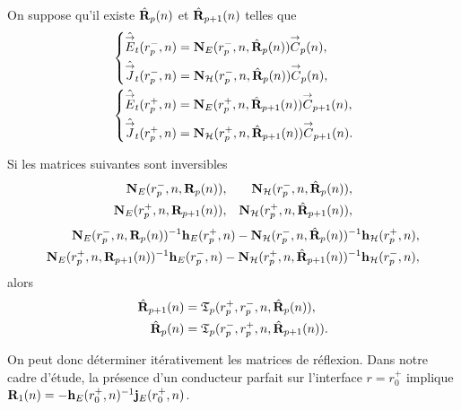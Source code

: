     \begin{prop}%
      \label{prop:sphere:synthese:reflexion}
      On suppose qu'il existe \(\hat{\mathbf{R}}_{p}(n)\) et \(\hat{\mathbf{R}}_{p+1}(n)\) telles que 
      \begin{align*}
      &\left\lbrace\begin{aligned}
        \hat{{\overset{\rightarrow}{E}}}_t(r_{p}^-,n) &= \mathbf{N}_{E}(r_p^-,n,\hat{\mathbf{R}}_{p}(n)){\overset{\rightarrow}{C}}_{p}(n),
        \\
        \hat{{\overset{\rightarrow}{J}}}_t(r_{p}^-,n) &= \mathbf{N}_{\mathcal{H}}(r_p^-,n,\hat{\mathbf{R}}_{p}(n)){\overset{\rightarrow}{C}}_{p}(n),
        \end{aligned}
      \right.
      \\
      &\left\lbrace\begin{aligned}
        \hat{{\overset{\rightarrow}{E}}}_t(r_{p}^+,n) &= \mathbf{N}_{E}(r_p^+,n,\hat{\mathbf{R}}_{p+1}(n)){\overset{\rightarrow}{C}}_{p+1}(n),
        \\
        \hat{{\overset{\rightarrow}{J}}}_t(r_{p}^+,n) &= \mathbf{N}_{\mathcal{H}}(r_p^+,n,\hat{\mathbf{R}}_{p+1}(n)){\overset{\rightarrow}{C}}_{p+1}(n).
        \end{aligned}
      \right.      
      \end{align*}

      Si les matrices suivantes sont inversibles
      \begin{align*}
        \mathbf{N}_{E}(r_p^-,n,\mathbf{R}_{p}(n)), && \mathbf{N}_{\mathcal{H}}(r_p^-,n,\hat{\mathbf{R}}_{p}(n)),
        \\
        \mathbf{N}_{E}(r_p^+,n,\mathbf{R}_{p+1}(n)), && \mathbf{N}_{\mathcal{H}}(r_p^+,n,\hat{\mathbf{R}}_{p+1}(n)),
      \end{align*}
      \begin{align*}
        \mathbf{N}_{E}(r_p^-,n,\mathbf{R}_{p}(n))^{-1}\mathbf{h}_{E}(r_p^+,n) - \mathbf{N}_{\mathcal{H}}(r_p^-,n,\hat{\mathbf{R}}_{p}(n))^{-1}\mathbf{h}_{\mathcal{H}}(r_p^+,n),
        \\
        \mathbf{N}_{E}(r_p^+,n,\mathbf{R}_{p+1}(n))^{-1}\mathbf{h}_{E}(r_p^-,n) - \mathbf{N}_{\mathcal{H}}(r_p^+,n,\hat{\mathbf{R}}_{p+1}(n))^{-1}\mathbf{h}_{\mathcal{H}}(r_p^-,n),
      \end{align*}
      alors
      \begin{align*}
        \hat{\mathbf{R}}_{p+1}(n) &= \mathfrak{T}_p(r_p^+,r_p^-,n,\hat{\mathbf{R}}_{p}(n)),
        \\
        \hat{\mathbf{R}}_{p}(n) &= \mathfrak{T}_p(r_p^-,r_p^+,n,\hat{\mathbf{R}}_{p+1}(n)).
      \end{align*}
    \end{prop}

    On peut donc déterminer itérativement les matrices de réflexion. Dans notre cadre d'étude, la présence d'un conducteur parfait sur l'interface \(r=r_0^+\) implique \(\mathbf{R}_{1}(n) = -\mathbf{h}_E(r_0^+,n)^{-1}\mathbf{j}_E(r_0^+,n)\).

